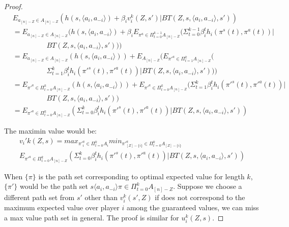 \begin{proof}
	\begin{equation}
	\begin{split}
	&E_{a_{[n]-Z} \in A_{[n]-Z}}(h(s,\langle a_i,a_{-i} \rangle) +\beta_iv_i^{k}(Z,s')|BT(Z,s,\langle a_i,a_{-i} \rangle,s')) \\
& = E_{a_{[n]-Z} \in A_{[n]-Z}}(h(s,\langle a_i,a_{-i} \rangle)+\beta_iE_{\pi^{a} \in \Pi_{t=0}^{k-1} A_{[n]-Z}}(\Sigma_{t=0}^{k-1} \beta_i^{t}h_{i}(\pi^{s}(t),\pi^{a}(t))|\\ &\hspace{2cm} BT(Z,s,\langle a_i,a_{-i} \rangle,s')))\\
& =E_{a_{[n]-Z} \in A_{[n]-Z}}(h(s,\langle a_i,a_{-i} \rangle)) +
	E_{A_{[n]-Z}}(E_{\pi'^{a} \in \Pi_{t=1}^{k}A_{[n]-Z}}(\\ &\hspace{2cm} \Sigma_{t=1}^{k} \beta_i^{t}h_{i}(\pi'^{s}(t),\pi'^{a}(t))|BT(Z,s,\langle a_i,a_{-i} \rangle,s')))\\
& =E_{\pi'^{a} \in \Pi_{t=0}^{k}A_{[n]-Z}}(h(s,\langle a_i,a_{-i} \rangle)) +
	E_{\pi'^{a} \in \Pi_{t=0}^{k} A_{[n]-Z}}(\Sigma_{t=1}^{k} \beta_i^{t}h_{i}(\pi'^{s}(t),\pi'^{a}(t))|\\ &\hspace{2cm} BT(Z,s,\langle a_i,a_{-i} \rangle,s'))\\
& =E_{\pi'^{a} \in \Pi_{t=0}^{k} A_{[n]-Z}}(\Sigma_{t=0}^{k} \beta_i^{t}h_{i}(\pi'^{s}(t),\pi'^{a}(t))|BT(Z,s,\langle a_i,a_{-i} \rangle,s'))
	\end{split}
	\end{equation}	
	
The maximin value would be:
	\begin{multline}
	v_i'k(Z,s) = max_{\pi'^{a}_{i} \in \Pi_{t=0}^{k} A_{i}}
	min_{\pi'^{a}_{[Z]-\{i\}} \in \Pi_{t=0}^{k} A_{[Z]-\{i\}}}\\
	E_{\pi'^{a} \in \Pi_{t=0}^{k} A_{[n]-Z}}(\Sigma_{t=0}^{k} \beta_i^{t}h_{i}(\pi'^{s}(t),\pi'^{a}(t))|BT(Z,s,\langle a_i,a_{-i} \rangle,s'))
	\end{multline}
	
	When $\{\pi\}$ is the path set corresponding to optimal expected value for length $k$,   $\{\pi'\}$ would be the path set $s\langle a_i,a_{-i}\rangle \pi \in \Pi_{t=0}^{k} A_{[n]-Z}$. Suppose we choose a different path set from $s'$ other than $v_i^k(s',Z)$ if does not correspond to the maximum expected value over player $i$ among the guaranteed values, we can miss a max value path set in general. The proof is similar for $u_i^k(Z,s)$.  %
\end{proof}

